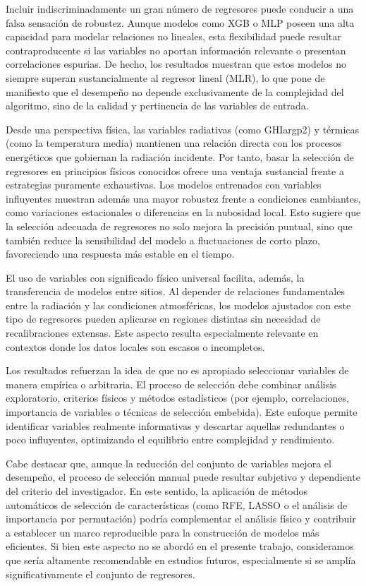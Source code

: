 Incluir indiscriminadamente un gran número de regresores puede conducir a una falsa sensación de robustez. Aunque modelos como XGB o MLP poseen una alta capacidad para modelar relaciones no lineales, esta flexibilidad puede resultar contraproducente si las variables no aportan información relevante o presentan correlaciones espurias. De hecho, los resultados muestran que estos modelos no siempre superan sustancialmente al regresor lineal (MLR), lo que pone de manifiesto que el desempeño no depende exclusivamente de la complejidad del algoritmo, sino de la calidad y pertinencia de las variables de entrada.

Desde una perspectiva física, las variables radiativas (como GHIargp2) y térmicas (como la temperatura media) mantienen una relación directa con los procesos energéticos que gobiernan la radiación incidente. Por tanto, basar la selección de regresores en principios físicos conocidos ofrece una ventaja sustancial frente a estrategias puramente exhaustivas. Los modelos entrenados con variables influyentes muestran además una mayor robustez frente a condiciones cambiantes, como variaciones estacionales o diferencias en la nubosidad local. Esto sugiere que la selección adecuada de regresores no solo mejora la precisión puntual, sino que también reduce la sensibilidad del modelo a fluctuaciones de corto plazo, favoreciendo una respuesta más estable en el tiempo.

El uso de variables con significado físico universal facilita, además, la transferencia de modelos entre sitios. Al depender de relaciones fundamentales entre la radiación y las condiciones atmosféricas, los modelos ajustados con este tipo de regresores pueden aplicarse en regiones distintas sin necesidad de recalibraciones extensas. Este aspecto resulta especialmente relevante en contextos donde los datos locales son escasos o incompletos.

Los resultados refuerzan la idea de que no es apropiado seleccionar variables de manera empírica o arbitraria. El proceso de selección debe combinar análisis exploratorio, criterios físicos y métodos estadísticos (por ejemplo, correlaciones, importancia de variables o técnicas de selección embebida). Este enfoque permite identificar variables realmente informativas y descartar aquellas redundantes o poco influyentes, optimizando el equilibrio entre complejidad y rendimiento.

Cabe destacar que, aunque la reducción del conjunto de variables mejora el desempeño, el proceso de selección manual puede resultar subjetivo y dependiente del criterio del investigador. En este sentido, la aplicación de métodos automáticos de selección de características (como RFE, LASSO o el análisis de importancia por permutación) podría complementar el análisis físico y contribuir a establecer un marco reproducible para la construcción de modelos más eficientes. Si bien este aspecto no se abordó en el presente trabajo, consideramos que sería altamente recomendable en estudios futuros, especialmente si se amplía significativamente el conjunto de regresores.

